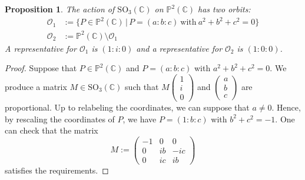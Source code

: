 \documentclass[12pt, a4paper, reqno, captions=tableheading,bibliography=totoc]{scrartcl}
\theoremstyle{plain}
\newtheorem{prop}[lemma]{Proposition}
\theoremstyle{definition}
\newcommand{\C}{\mathbb{C}}
\newcommand{\p}{\mathbb{P}}
\begin{document}
\begin{prop}
 The action of $\mathrm{SO}_3(\mathbb{C})$ on $\p^2(\C)$ has two orbits:
 \begin{align*}
  \mathcal{O}_1 &:=
  \bigl\{
   P \in \p^2(\C) \, | \,
   P = (a:b:c) \  \text{with} \  a^2 + b^2 + c^2 = 0
  \bigr\} \\
  \mathcal{O}_2 &:= \p^2(\C) \setminus \mathcal{O}_1
 \end{align*}
 A representative for $\mathcal{O}_1$ is $(1:i:0)$ and a representative for $\mathcal{O}_2$ is $(1:0:0)$.
\end{prop}
\begin{proof}
 Suppose that $P \in \p^2(\C)$ and $P = (a:b:c)$ with $a^2 + b^2 + c^2 = 0$.
 We produce a matrix $M \in \mathrm{SO}_3(\C)$ such that $M \left(\begin{smallmatrix} 1 \\ i \\ 0 \end{smallmatrix}\right)$ and $\left(\begin{smallmatrix} a \\ b \\ c \end{smallmatrix}\right)$ are proportional.
 Up to relabeling the coordinates, we can suppose that $a \neq 0$.
 Hence, by rescaling the coordinates of $P$, we have $P = (1: b: c)$ with $b^2 + c^2 = -1$.
 One can check that the matrix
 \[
  M :=
  \begin{pmatrix}
   -1 & 0 & 0 \\
   0 & ib & -ic \\
   0 & ic & ib
  \end{pmatrix}
 \]
 satisfies the requirements.


\end{proof}
\end{document}
